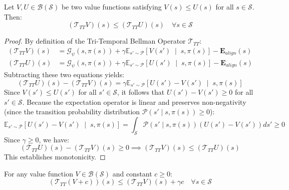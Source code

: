 \documentclass[manuscript, screen, review]{jair}
\begin{document}
\begin{lemma}
Let $V, U \in \mathcal{B}(\mathcal{S})$ be two value functions satisfying $V(s) \le U(s)$ for all $s \in \mathcal{S}$. Then:
\begin{equation}
    \left( \mathcal{T}_{TT} V \right)(s) \le \left( \mathcal{T}_{TT} U \right)(s) \quad \forall s \in \mathcal{S}
\end{equation}
\end{lemma}

\begin{proof}
By definition of the Tri-Temporal Bellman Operator $\mathcal{T}_{TT}$:
\begin{align*}
    \left( \mathcal{T}_{TT} V \right)(s) &= \mathcal{G}_\psi(s, \pi(s)) + \gamma \mathbb{E}_{s' \sim \mathcal{P}} \left[ V(s') \;\middle|\; s, \pi(s) \right] - \mathbf{E}_{align}(s) \\
    \left( \mathcal{T}_{TT} U \right)(s) &= \mathcal{G}_\psi(s, \pi(s)) + \gamma \mathbb{E}_{s' \sim \mathcal{P}} \left[ U(s') \;\middle|\; s, \pi(s) \right] - \mathbf{E}_{align}(s)
\end{align*}
Subtracting these two equations yields:
\begin{equation*}
    \left( \mathcal{T}_{TT} U \right)(s) - \left( \mathcal{T}_{TT} V \right)(s) = \gamma \mathbb{E}_{s' \sim \mathcal{P}} \left[ U(s') - V(s') \;\middle|\; s, \pi(s) \right]
\end{equation*}
Since $V(s') \le U(s')$ for all $s' \in \mathcal{S}$, it follows that $U(s') - V(s') \ge 0$ for all $s' \in \mathcal{S}$. Because the expectation operator is linear and preserves non-negativity (since the transition probability distribution $\mathcal{P}(s' \mid s, \pi(s)) \ge 0$):
\begin{equation*}
    \mathbb{E}_{s' \sim \mathcal{P}} \left[ U(s') - V(s') \;\middle|\; s, \pi(s) \right] = \int_{\mathcal{S}} \mathcal{P}(s' \mid s, \pi(s)) \left( U(s') - V(s') \right) ds' \ge 0
\end{equation*}
Since $\gamma \ge 0$, we have:
\begin{equation*}
    \left( \mathcal{T}_{TT} U \right)(s) - \left( \mathcal{T}_{TT} V \right)(s) \ge 0 \implies \left( \mathcal{T}_{TT} V \right)(s) \le \left( \mathcal{T}_{TT} U \right)(s)
\end{equation*}
This establishes monotonicity.
\end{proof}

\begin{lemma}
For any value function $V \in \mathcal{B}(\mathcal{S})$ and constant $c \ge 0$:
\begin{equation}
    \left( \mathcal{T}_{TT} (V + c) \right)(s) \le \left( \mathcal{T}_{TT} V \right)(s) + \gamma c \quad \forall s \in \mathcal{S}
\end{equation}
\end{lemma}
\end{document}
